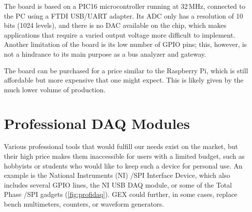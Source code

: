 The board is based on a PIC16 microcontroller running at 32\,MHz, connected to the \gls{PC} using a FTDI \gls{USB}/\gls{UART} adapter. Its \gls{ADC} only has a resolution of 10 bits (1024 levels), and there is no \gls{DAC} available on the chip, which makes applications that require a varied output voltage more difficult to implement. Another limitation of the board is its low number of \gls{GPIO} pins; this, however, is not a hindrance to its main purpose as a bus analyzer and gateway.

The board can be purchased for a price similar to the Raspberry Pi, which is still affordable but more expensive that one might expect. This is likely given by the much lower volume of production.

\section{Professional DAQ Modules}

Various professional tools that would fulfill our needs exist on the market, but their high price makes them inaccessible for users with a limited budget, such as hobbyists or students who would like to keep such a device for personal use. An example is the National Instruments (NI) \IIC/SPI Interface Device, which also includes several \gls{GPIO} lines, the NI USB DAQ module, or some of the Total Phase \IIC/SPI gadgets (\cref{fig:profidaq}). GEX could further, in some cases, replace bench multimeters, counters, or waveform generators.

